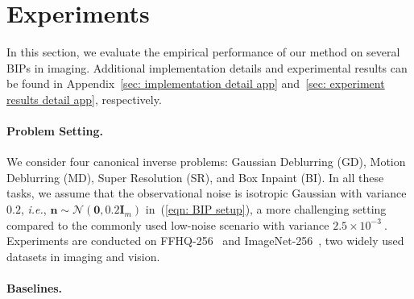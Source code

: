 \documentclass{article}
\numberwithin{equation}{section}
\def\eqref#1{(\ref{#1})}
\def\vzero{{\bm{0}}}
\def\vn{{\bm{n}}}
\def\mI{{\bm{I}}}
\def\gN{{\mathcal{N}}}
\begin{document}

\section{Experiments}
\label{sec: results of numerics}

In this section, we evaluate the empirical performance of our method on several BIPs in imaging. Additional implementation details and experimental results can be found in Appendix~\ref{sec: implementation detail app} and~\ref{sec: experiment results detail app}, respectively. 

\paragraph{Problem Setting.}

We consider four canonical inverse problems: Gaussian Deblurring (GD), Motion Deblurring (MD), Super Resolution (SR), and Box Inpaint (BI). In all these tasks, we assume that the observational noise is isotropic Gaussian with variance $0.2$, \emph{i.e.}, $\vn \sim \gN(\vzero, 0.2 \mI_m)$ in~\eqref{eqn: BIP setup}, a more challenging setting compared to the commonly used low-noise scenario with variance $2.5 \times 10^{-3}~$\cite{dou2024diffusion,wu2024principled}. Experiments are conducted on FFHQ-256~\cite{karras2019style} and ImageNet-256~\cite{deng2009imagenet}, two widely used datasets in imaging and vision.

\paragraph{Baselines.}
\end{document}
